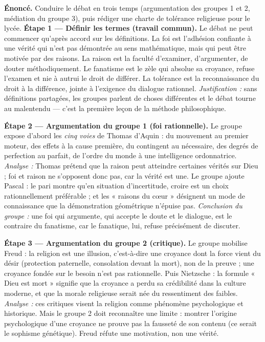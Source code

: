 \documentclass[11pt]{article}
\newcommand{\cle}[1]{{\popxbold\color{popdark}#1}}
\newcounter{popsec}
\newcounter{popsub}
\newcommand{\courssub}[1]{%
  \stepcounter{popsub}%
  \par\vspace{9pt}\noindent{\popxbold\fontsize{11.5}{13}\selectfont\color{popink}{\color{poporange}\thepopsec.\thepopsub}\hspace{6pt}#1}\par\nopagebreak\vspace{4pt}
}
\begin{document}
\courssub{Démarche et corrigé commenté}

\begin{exoresolu}
\textbf{Énoncé.} Conduire le débat en trois temps (argumentation des groupes 1 et 2, médiation du groupe 3), puis rédiger une charte de tolérance religieuse pour le lycée.
\tcblower
\textbf{Étape 1 — Définir les termes (travail commun).} Le débat ne peut commencer qu'après accord sur les définitions. La \cle{foi} est l'adhésion confiante à une vérité qui n'est pas démontrée au sens mathématique, mais qui peut être motivée par des raisons. La \cle{raison} est la faculté d'examiner, d'argumenter, de douter méthodiquement. Le \cle{fanatisme} est le zèle qui absolue sa croyance, refuse l'examen et nie à autrui le droit de différer. La \cle{tolérance} est la reconnaissance du droit à la différence, jointe à l'exigence du dialogue rationnel. \emph{Justification :} sans définitions partagées, les groupes parlent de choses différentes et le débat tourne au malentendu — c'est la première leçon de la méthode philosophique.

\textbf{Étape 2 — Argumentation du groupe 1 (foi rationnelle).} Le groupe expose d'abord les \emph{cinq voies} de Thomas d'Aquin : du mouvement au premier moteur, des effets à la cause première, du contingent au nécessaire, des degrés de perfection au parfait, de l'ordre du monde à une intelligence ordonnatrice. \emph{Analyse :} Thomas prétend que la raison peut atteindre certaines vérités sur Dieu ; foi et raison ne s'opposent donc pas, car la vérité est une. Le groupe ajoute Pascal : le pari montre qu'en situation d'incertitude, croire est un choix rationnellement préférable ; et les « raisons du cœur » désignent un mode de connaissance que la démonstration géométrique n'épuise pas. \emph{Conclusion du groupe :} une foi qui argumente, qui accepte le doute et le dialogue, est le contraire du fanatisme, car le fanatique, lui, refuse précisément de discuter.

\textbf{Étape 3 — Argumentation du groupe 2 (critique).} Le groupe mobilise Freud : la religion est une illusion, c'est-à-dire une croyance dont la force vient du désir (protection paternelle, consolation devant la mort), non de la preuve ; une croyance fondée sur le besoin n'est pas rationnelle. Puis Nietzsche : la formule « Dieu est mort » signifie que la croyance a perdu sa crédibilité dans la culture moderne, et que la morale religieuse serait née du ressentiment des faibles. \emph{Analyse :} ces critiques visent la religion comme phénomène psychologique et historique. Mais le groupe 2 doit reconnaître une limite : montrer l'origine psychologique d'une croyance ne prouve pas la fausseté de son contenu (ce serait le sophisme génétique). Freud réfute une motivation, non une vérité.


\end{exoresolu}
\end{document}
